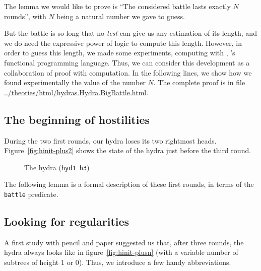 


The lemma we would like to prove is ``The considered battle lasts exactly $N$ rounds'',
with $N$ being a natural number we gave to guess.

But the  battle is so long that no \emph{test} can give us any estimation of its length, and we do need the expressive power of logic to compute this length. However, in order to  guess this length, we made some experiments, computing with \gallina{}, \coq{}'s  functional programming language.
Thus, we can consider this development as a collaboration of proof with computation.
In the following lines, we show how we found experimentally the value of the number $N$.
The complete proof is in file \url{../theories/html/hydras.Hydra.BigBattle.html}. 

\subsection{The beginning of hostilities}
During the two first rounds, our hydra loses its two rightmost heads.  Figure~\vref{fig:hinit-plus2} shows the state of the hydra   just before the third round.


\begin{figure}[h]
  \centering

  \caption{The hydra (\texttt{hyd1 h3})}
  \label{fig:hinit-plus2}
\end{figure}

The following lemma  is a formal description of these first rounds, in terms of the
\texttt{battle} predicate.





\subsection{Looking for regularities}


A first study with pencil and paper suggested us that, after three rounds, the hydra always looks like in figure~\vref{fig:hinit-plusn} (with a variable number of 
subtrees of height 1 or 0).
Thus, we introduce a few handy abbreviations.

